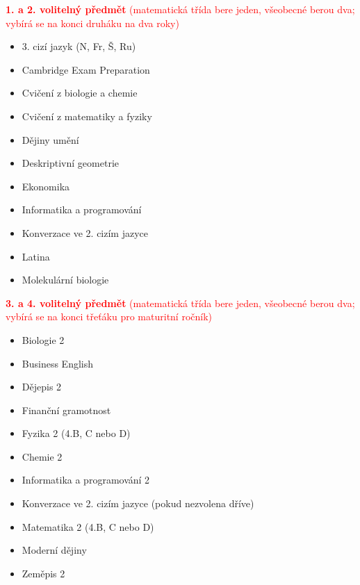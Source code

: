 \documentclass[a5paper, twoside]{article}
\begin{document}
\begin{multicols}{2}
	\noindent \textcolor{red}{\textbf{1. a 2. volitelný předmět} (matematická třída bere jeden, všeobecné berou dva; vybírá se na konci druháku na dva roky)}
	\begin{itemize}
		\item 3. cizí jazyk (N, Fr, Š, Ru)
		\item Cambridge Exam Preparation
		\item Cvičení z biologie a chemie
		\item Cvičení z matematiky a fyziky
		\item Dějiny umění
		\item Deskriptivní geometrie
		\item Ekonomika
		\item Informatika a programování
		\item Konverzace ve 2. cizím jazyce
		\item Latina
		\item Molekulární biologie
	\end{itemize}

	\noindent \textcolor{red}{\textbf{3. a 4. volitelný předmět} (matematická třída bere jeden, všeobecné berou dva; vybírá se na konci třeťáku pro maturitní ročník)}
	\begin{itemize}
		\item Biologie 2
		\item Business English
		\item Dějepis 2
		\item Finanční gramotnost
		\item Fyzika 2 (4.B, C nebo D)
		\item Chemie 2
		\item Informatika a programování 2
		\item Konverzace ve 2. cizím jazyce
		      (pokud nezvolena dříve)
		\item Matematika 2 (4.B, C nebo D)
		\item Moderní dějiny
		\item Zeměpis 2
	\end{itemize}

	\vfill\null

	\columnbreak


\end{multicols}
\end{document}
